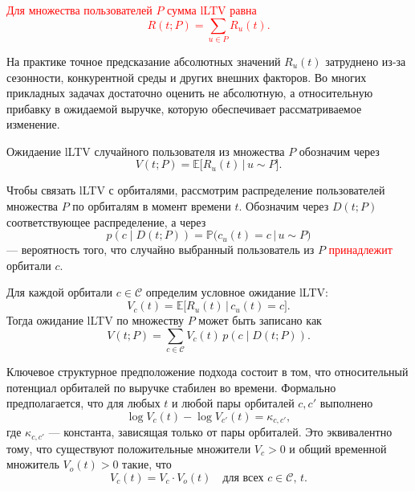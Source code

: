 \textcolor{red}{
Для множества пользователей $P$ сумма lLTV равна
\begin{equation}
    R(t; P) = \sum_{u \in P} R_u(t).
\end{equation}
}


На практике точное предсказание абсолютных значений $R_u(t)$
затруднено из-за сезонности, конкурентной среды и других внешних
факторов. Во многих прикладных задачах достаточно оценить не абсолютную,
а относительную прибавку в ожидаемой выручке, которую обеспечивает
рассматриваемое изменение.

Ожидаение lLTV случайного пользователя из множества $P$
обозначим через
\begin{equation}
    V(t; P) = \mathbb{E}\big[ R_u(t) \,\big|\, u \sim P \big].
\end{equation}

Чтобы связать lLTV с орбиталями, рассмотрим распределение
пользователей множества $P$ по орбиталям в момент времени $t$.
Обозначим через $D(t; P)$ соответствующее распределение, а через
\begin{equation}
    p(c \mid D(t; P)) =
      \mathbb{P}\big( c_u(t) = c \,\big|\, u \sim P \big)
\end{equation}
— вероятность того, что случайно выбранный пользователь из $P$
\textcolor{red}{принадлежит} орбитали $c$.

Для каждой орбитали $c \in \mathcal{C}$ определим условное ожидание lLTV:
\begin{equation}
    V_c(t) = \mathbb{E}\big[ R_u(t) \,\big|\, c_u(t) = c \big].
\end{equation}
Тогда ожидание lLTV по множеству $P$ может быть записано как
\begin{equation}
    V(t; P) =
      \sum_{c \in \mathcal{C}} V_c(t)\, p(c \mid D(t; P)).
\end{equation}

Ключевое структурное предположение подхода состоит в том, что
относительный потенциал орбиталей по выручке стабилен во времени.
Формально предполагается, что для любых $t$ и любой пары орбиталей
$c, c'$ выполнено
\begin{equation}
    \log V_c(t) - \log V_{c'}(t) = \kappa_{c,c'},
\end{equation}
где $\kappa_{c,c'}$ — константа, зависящая только от пары орбиталей.
Это эквивалентно тому, что существуют положительные множители $V_c > 0$ и общий
временной множитель $V_o(t) > 0$ такие, что
\begin{equation}
    V_c(t) = V_c \cdot V_o(t)
    \quad \text{для всех } c \in \mathcal{C},\, t.
\end{equation}

